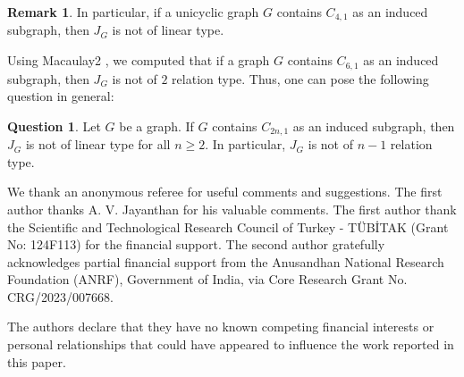 \documentclass[11pt,a4paper,reqno]{amsart}
\theoremstyle{definition}
\newtheorem{remark}[theorem]{Remark}
\newtheorem{question}[theorem]{Question}
\begin{document}
\begin{remark}
   In particular, if a unicyclic graph $G$ contains $C_{4,1}$ as an induced subgraph, then $J_G$ is not of linear type.
\end{remark}

Using Macaulay2 \cite{M2}, we computed that if a graph $G$ contains $C_{6,1}$ as an induced subgraph, then $J_G$ is not of $2$ relation type. Thus, one can pose the following question in general:

\begin{question}
    Let $G$ be a graph. If $G$ contains $C_{2n,1}$ as an induced subgraph, then $J_G$ is not of linear type for all $n \geq 2$. In particular, $J_G$ is not of $n-1$ relation type.
\end{question}




 We thank an anonymous referee for useful comments and suggestions. The first author thanks A. V. Jayanthan for his valuable comments. The first author thank the Scientific and Technological Research Council of Turkey - T\"UB\.{I}TAK (Grant No: 124F113) for the financial support. The second author gratefully acknowledges partial financial support from the Anusandhan National Research Foundation (ANRF), Government of India, via Core Research Grant No. CRG/2023/007668.

\vspace{2mm}

 The authors declare that they have no known competing financial interests or personal relationships that could have appeared to influence the work reported in this paper.
\end{document}
